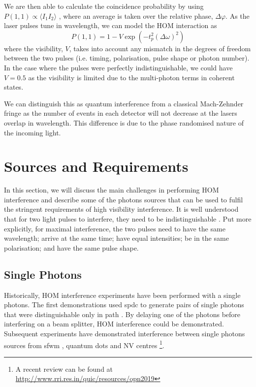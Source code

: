 We are then able to calculate the coincidence probability by using $P(1,1) \propto \langle I_1 I_2\rangle$ \cite{Rarity2005}, where an average is taken over the relative phase, $\Delta\varphi$. As the laser pulses tune in wavelength, we can model the \ac{HOM} interaction as 
\begin{equation}
	P(1,1) = 1 - V \exp{\left(-t_p^2(\Delta\omega)^2\right)}
	\label{eq:gaussian}
\end{equation}
where the visibility, $V$, takes into account any mismatch in the degrees of freedom between the two pulses (i.e. timing, polarisation, pulse shape or photon number). In the case where the pulses were perfectly indistinguishable, we could have $V = 0.5$ as the visibility is limited due to the multi-photon terms in coherent states.

We can distinguish this as quantum interference from a classical Mach-Zehnder fringe as the number of events in each detector will not decrease at the lasers overlap in wavelength. This difference is due to the phase randomised nature of the incoming light.

\section{Sources and Requirements}
\label{sec:sources}

In this section, we will discuss the main challenges in performing \ac{HOM} interference and describe some of the photons sources that can be used to fulfil the stringent requirements of high visibility interference. It is well understood that for two light pulses to interfere, they need to be indistinguishable \cite{}. Put more explicitly, for maximal interference, the two pulses need to have the same wavelength; arrive at the same time; have equal intensities; be in the same polarisation; and have the same pulse shape.

\subsection{Single Photons}

Historically, \acl{HOM} interference experiments have been performed with a single photons. The first demonstrations used \ac{spdc} to generate pairs of single photons that were distinguishable only in path \cite{}. By delaying one of the photons before interfering on a beam splitter, \ac{HOM} interference could be demonstrated. Subsequent experiments have demonstrated interference between single photons sources from \ac{sfwm} \cite{}, quantum dots \cite{} and NV centres \cite{} \footnote{A recent review can be found at \url{http://www.rri.res.in/quic/resources/opn2019}}.

